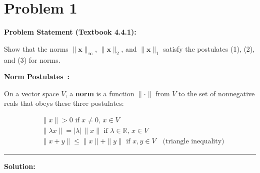 \clearpage
\section*{Problem 1}

\textbf{Problem Statement (Textbook 4.4.1):} 

Show that the norms $\|\mathbf{x}\|_\infty$, $\|\mathbf{x}\|_2$, and $\|\mathbf{x}\|_1$ satisfy the postulates (1), (2), and (3) for norms.

\vspace{0.5em}

\textbf{Norm Postulates~\cite{kincaid2009numerical, panchenko_448_notes}:}

On a vector space $V$, a \textbf{norm} is a function $\|\cdot\|$ from $V$ to the set of nonnegative reals that obeys these three postulates:

\begin{align*}
&\|x\| > 0 \text{ if } x \neq 0, \, x \in V \tag{1} \\
&\|\lambda x\| = |\lambda| \, \|x\| \text{ if } \lambda \in \mathbb{R}, \, x \in V \tag{2} \\
&\|x + y\| \leq \|x\| + \|y\| \text{ if } x, y \in V \quad \text{(triangle inequality)} \tag{3}
\end{align*}

\noindent\rule{\textwidth}{0.4pt}

\vspace{1em}

\textbf{Solution:}

